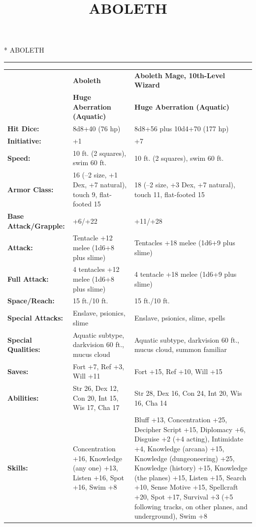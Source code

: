 \documentclass[DIV=14, paper=a4, fontsize=10pt, twocolumn, twoside]{scrartcl}
\title{ABOLETH} %
\date{} %
\makeatletter
\newcommand{\HorRule}{\color{dndblue} \rule{\linewidth}{1pt}} %
\let\origsection\section
\renewcommand\section{\@ifstar{\starsection}{\nostarsection}}
\newcommand\nostarsection[1]
{\origsection{#1}\vspace{-0.5em}}
\newcommand\starsection[1]
{\vspace{-0.5cm}\origsection*{#1}\vspace{-0.3cm}}
\newcommand\dndheading[1]{%
	\renewcommand*{\raggedsection}{\raggedleft}
	\section*{\color{dndblue} \huge #1}
	\renewcommand*{\raggedsection}{\raggedright}
	\vspace{-0.4cm}
	\HorRule
	\color{black}
}
\makeatother
\begin{document}
\dndheading{ABOLETH}
\begin{table}[th!]
	\begin{tabular}{p{3.5cm}p{5.5cm}p{6cm}}
		& \textbf{Aboleth} & \textbf{Aboleth Mage, 10th-Level Wizard}\\
		& \textbf{Huge Aberration (Aquatic)} & \textbf{Huge Aberration (Aquatic)}\\
	    \rowcolor{Tan!50}
		\textbf{Hit Dice:} & 8d8+40 (76 hp) & 8d8+56 plus 10d4+70 (177 hp)\\
		\textbf{Initiative:} & +1 & +7\\
	    \rowcolor{Tan!50}
		\textbf{Speed:} & 10 ft. (2 squares), swim 60 ft. & 10 ft. (2 squares), swim 60 ft.\\
		\textbf{Armor Class:} & 16 (–2 size, +1 Dex, +7 natural), touch 9, flat-footed 15 & 18 (–2 size, +3 Dex, +7 natural), touch 11, flat-footed 15\\
		\rowcolor{Tan!50}
		\textbf{Base Attack/Grapple:} & +6/+22 & +11/+28\\
		\textbf{Attack:} & Tentacle +12 melee (1d6+8 plus slime) & Tentacles +18 melee (1d6+9 plus slime)\\
		\rowcolor{Tan!50}
		\textbf{Full Attack:} & 4 tentacles +12 melee (1d6+8 plus slime) & 4 tentacle +18 melee (1d6+9 plus slime)\\
		\textbf{Space/Reach:} & 15 ft./10 ft. & 15 ft./10 ft.\\
		\rowcolor{Tan!50}
		\textbf{Special Attacks:} & Enslave, psionics, slime & Enslave, psionics, slime, spells\\
		\textbf{Special Qualities:} & Aquatic subtype, darkvision 60 ft., mucus cloud & Aquatic subtype, darkvision 60 ft., mucus cloud, summon familiar\\
		\rowcolor{Tan!50}
		\textbf{Saves:} & Fort +7, Ref +3, Will +11 & Fort +15, Ref +10, Will +15\\
		\textbf{Abilities:} & Str 26, Dex 12, Con 20, Int 15, Wis 17, Cha 17 & Str 28, Dex 16, Con 24, Int 20, Wis 16, Cha 14\\
		\rowcolor{Tan!50}
		\textbf{Skills:} & Concentration +16, Knowledge (any one) +13, Listen +16, Spot +16, Swim +8 & Bluff +13, Concentration +25, Decipher Script +15, Diplomacy +6, Disguise +2 (+4 acting), Intimidate +4, Knowledge (arcana) +15, Knowledge (dungeoneering) +25, Knowledge (history) +15, Knowledge (the planes) +15, Listen +15, Search +10, Sense Motive +15, Spellcraft +20, Spot +17, Survival +3 (+5 following tracks, on other planes, and underground), Swim +8\\

\end{tabular}
\end{table}
\end{document}
